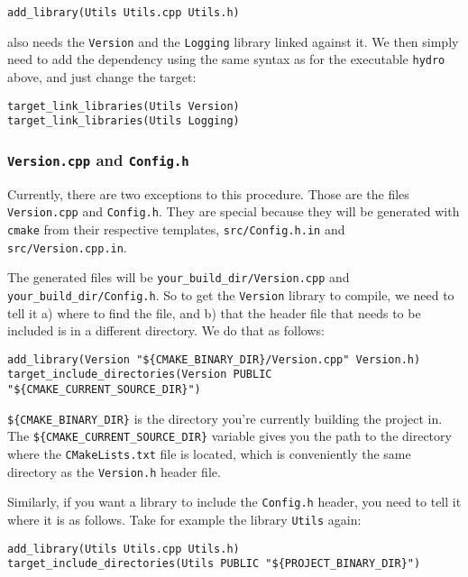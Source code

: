 \begin{lstlisting}
add_library(Utils Utils.cpp Utils.h)
\end{lstlisting}

also needs the \verb|Version| and the \verb|Logging| library linked against it.
We then simply need to add the dependency using the same syntax as for the
executable \verb|hydro| above, and just change the target:

\begin{lstlisting}
target_link_libraries(Utils Version)
target_link_libraries(Utils Logging)
\end{lstlisting}





\subsubsection{\texttt{Version.cpp} and \texttt{Config.h}}

Currently, there are two exceptions to this procedure. Those are the files
\verb|Version.cpp| and \verb|Config.h|. They are special because they will be
generated with \verb|cmake| from their respective templates,
\verb|src/Config.h.in| and \verb|src/Version.cpp.in|.

The generated files will be \verb|your_build_dir/Version.cpp| and
\verb|your_build_dir/Config.h|.  So to get the \verb|Version| library to
compile, we need to tell it a) where to find the file, and b) that the header
file that needs to be included is in a different directory. We do that as
follows:


\begin{lstlisting}
add_library(Version "${CMAKE_BINARY_DIR}/Version.cpp" Version.h)
target_include_directories(Version PUBLIC "${CMAKE_CURRENT_SOURCE_DIR}")
\end{lstlisting}

\verb|${CMAKE_BINARY_DIR}| is the directory you're currently building the
project in. The \verb|${CMAKE_CURRENT_SOURCE_DIR}| variable gives you the path
to the directory where the \verb|CMakeLists.txt| file is located, which is
conveniently the same directory as the \verb|Version.h| header file.



Similarly, if you want a library to include the \verb|Config.h| header, you need to tell it where it is as follows. Take for example the library \verb|Utils| again:

\begin{lstlisting}
add_library(Utils Utils.cpp Utils.h)
target_include_directories(Utils PUBLIC "${PROJECT_BINARY_DIR}")
\end{lstlisting}




